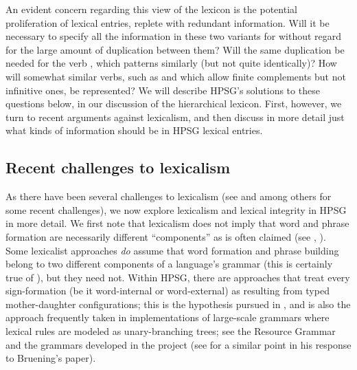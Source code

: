 \documentclass[output=paper
 	        ,biblatex
                ,babelshorthands
                ,newtxmath
                ,draftmode
                ,colorlinks, citecolor=brown
]{langscibook}
\begin{document}
An evident concern regarding this view of the lexicon is the potential proliferation of lexical entries, replete with redundant information. Will it be necessary to specify all the information in these two variants for  without regard for the large amount of duplication between them? Will the same duplication be needed for the verb  , which patterns similarly (but not quite identically)? How will somewhat similar verbs, such as  and  which allow finite complements but not infinitive ones, be represented? We will describe HPSG's solutions to these questions below, in our discussion of the hierarchical lexicon. First, however, we turn to recent arguments against lexicalism, and then discuss in more detail just what kinds of information should be in HPSG lexical entries.

\subsection{Recent challenges to lexicalism}

As there have been several challenges to lexicalism (see \citealt{Bruening2018} and  \citealt{Haspelmath2011} among others for some recent challenges), we now explore lexicalism and lexical integrity in HPSG in more detail. We first note that lexicalism does not imply that word and phrase formation are necessarily different ``components'' as is often claimed (see \citealt{Marantz1997}, \citealt{Bruening2018}). Some lexicalist approaches \emph{do} assume that word formation and phrase building belong to two different components of a language's grammar (this is certainly true of \citealt{Jackendoff1975}), but they need not. Within HPSG, there are approaches that treat every sign-formation (be it word-internal or word-external) as resulting from typed mother-daughter configurations; this is the hypothesis pursued in \citealt{Koenig1999c}, and is also the approach frequently taken in implementations of large-scale grammars where lexical rules are modeled as unary-branching trees; see the  Resource Grammar \citep{Copestake2002} and the grammars developed in the  project \citep{Mueller2015}  (see \citealt[58]{MuellerLexicalism} for a similar point in his response to Bruening's paper). 
\end{document}
